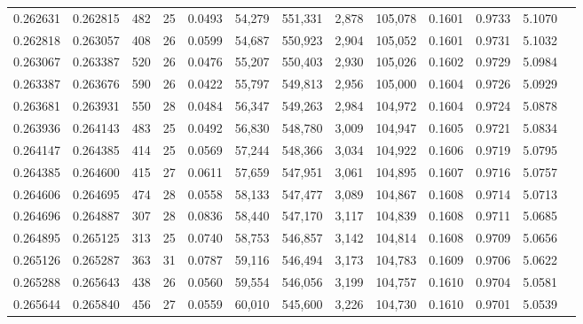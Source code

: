 \begin{tabular}{rrrrrrrrrrrrr}
0.262631 & 0.262815 & 482 &  25 &                                     0.0493 &  54,279 & 551,331 &   2,878 & 105,078 & 0.1601 & 0.9733 & 5.1070 \\
0.262818 & 0.263057 & 408 &  26 &                                     0.0599 &  54,687 & 550,923 &   2,904 & 105,052 & 0.1601 & 0.9731 & 5.1032 \\
0.263067 & 0.263387 & 520 &  26 &                                     0.0476 &  55,207 & 550,403 &   2,930 & 105,026 & 0.1602 & 0.9729 & 5.0984 \\
0.263387 & 0.263676 & 590 &  26 &                                     0.0422 &  55,797 & 549,813 &   2,956 & 105,000 & 0.1604 & 0.9726 & 5.0929 \\
0.263681 & 0.263931 & 550 &  28 &                                     0.0484 &  56,347 & 549,263 &   2,984 & 104,972 & 0.1604 & 0.9724 & 5.0878 \\
0.263936 & 0.264143 & 483 &  25 &                                     0.0492 &  56,830 & 548,780 &   3,009 & 104,947 & 0.1605 & 0.9721 & 5.0834 \\
0.264147 & 0.264385 & 414 &  25 &                                     0.0569 &  57,244 & 548,366 &   3,034 & 104,922 & 0.1606 & 0.9719 & 5.0795 \\
0.264385 & 0.264600 & 415 &  27 &                                     0.0611 &  57,659 & 547,951 &   3,061 & 104,895 & 0.1607 & 0.9716 & 5.0757 \\
0.264606 & 0.264695 & 474 &  28 &                                     0.0558 &  58,133 & 547,477 &   3,089 & 104,867 & 0.1608 & 0.9714 & 5.0713 \\
0.264696 & 0.264887 & 307 &  28 &                                     0.0836 &  58,440 & 547,170 &   3,117 & 104,839 & 0.1608 & 0.9711 & 5.0685 \\
0.264895 & 0.265125 & 313 &  25 &                                     0.0740 &  58,753 & 546,857 &   3,142 & 104,814 & 0.1608 & 0.9709 & 5.0656 \\
0.265126 & 0.265287 & 363 &  31 &                                     0.0787 &  59,116 & 546,494 &   3,173 & 104,783 & 0.1609 & 0.9706 & 5.0622 \\
0.265288 & 0.265643 & 438 &  26 &                                     0.0560 &  59,554 & 546,056 &   3,199 & 104,757 & 0.1610 & 0.9704 & 5.0581 \\
0.265644 & 0.265840 & 456 &  27 &                                     0.0559 &  60,010 & 545,600 &   3,226 & 104,730 & 0.1610 & 0.9701 & 5.0539 \\

\end{tabular}
